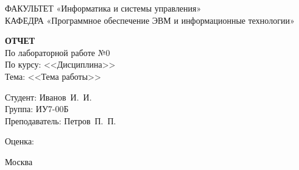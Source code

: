 \begin{titlepage}
	{\doublespacing \small \raggedright ФАКУЛЬТЕТ \hspace{25mm} «Информатика и системы управления»\\
	КАФЕДРА \hspace{5mm} «Программное обеспечение ЭВМ и информационные технологии»\\}

	\vspace{30mm}
	
	\textbf{ОТЧЕТ}\\
	По лабораторной работе №0\\
	По курсу: <<Дисциплина>>\\
	Тема: <<Тема работы>>\\

	\vspace{60mm}

	\hspace{70mm} Студент:       \hfill Иванов~И.~И.\\
	\hspace{70mm} Группа:        \hfill ИУ7-00Б\\
	\hspace{70mm} Преподаватель: \hfill Петров~П.~П.\\
	{\raggedright \hspace{70mm} Оценка: \hfill \hrulefill\\}

	\vfill
	
	Москва\\
	\the\year
\end{titlepage}
